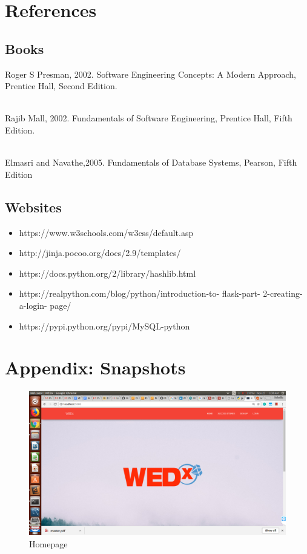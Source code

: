 \documentclass[12pt]{report}
\begin{document}
\chapter{References} 

\section{Books}
\noindent [1] Roger S Presman, 2002. Software Engineering Concepts: A Modern Approach, Prentice Hall, Second Edition. \\\

\noindent [2] Rajib Mall, 2002. Fundamentals of Software Engineering, Prentice Hall, Fifth Edition. \\\

\noindent [3] Elmasri and Navathe,2005. Fundamentals of Database Systems, Pearson, Fifth Edition


\section{Websites}

\begin{itemize}
\item https://www.w3schools.com/w3css/default.asp
\item http://jinja.pocoo.org/docs/2.9/templates/
\item https://docs.python.org/2/library/hashlib.html
\item https://realpython.com/blog/python/introduction-to- flask-part- 2-creating- a-login-
page/
\item https://pypi.python.org/pypi/MySQL-python
\end{itemize}

\chapter{Appendix: Snapshots} 

\begin{figure}[!htb]
    \centering
    \includegraphics[width=1\textwidth]{sc-1.png}
    \caption{Homepage}
    \label{fig:Homepage}
\end{figure}
\end{document}
